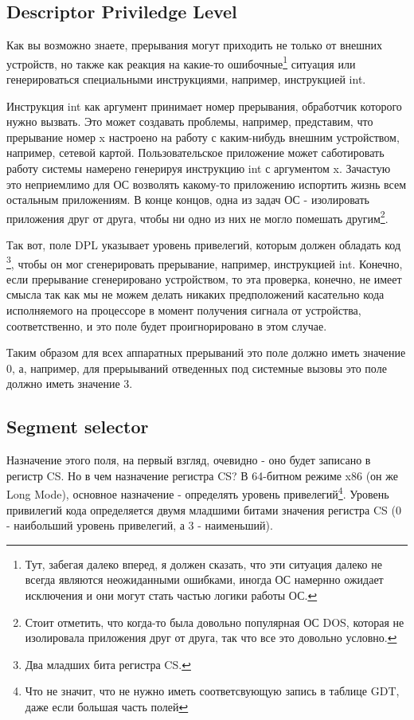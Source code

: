 \subsection{Descriptor Priviledge Level}

Как вы возможно знаете, прерывания могут приходить не только от внешних
устройств, но также как реакция на какие-то ошибочные\footnote{Тут, забегая
далеко вперед, я должен сказать, что эти ситуация далеко не всегда являются
неожиданными ошибками, иногда ОС намернно ожидает исключения и они могут стать
частью логики работы ОС.} ситуация или генерироваться специальными инструкциями,
например, инструкцией int.

Инструкция int как аргумент принимает номер прерывания, обработчик которого
нужно вызвать. Это может создавать проблемы, например, представим, что
прерывание номер x настроено на работу с каким-нибудь внешним устройством,
например, сетевой картой. Пользовательское приложение может саботировать работу
системы намерено генерируя инструкцию int с аргументом x. Зачастую это
неприемлимо для ОС возволять какому-то приложению испортить жизнь всем
остальным приложениям. В конце концов, одна из задач ОС - изолировать приложения
друг от друга, чтобы ни одно из них не могло помешать другим\footnote{Стоит
отметить, что когда-то была довольно популярная ОС DOS, которая не изолировала
приложения друг от друга, так что все это довольно условно.}.

Так вот, поле DPL указывает уровень привелегий, которым должен обладать код
\footnote{Два младших бита регистра CS.}, чтобы он мог сгенерировать прерывание,
например, инструкцией int. Конечно, если прерывание сгенерировано устройством,
то эта проверка, конечно, не имеет смысла так как мы не можем делать никаких
предположений касательно кода исполняемого на процессоре в момент получения
сигнала от устройства, соответственно, и это поле будет проигнорировано в этом
случае.

Таким образом для всех аппаратных прерываний это поле должно иметь значение 0,
а, например, для прерыываний отведенных под системные вызовы это поле должно
иметь значение 3.

\subsection{Segment selector}

Назначение этого поля, на первый взгляд, очевидно - оно будет записано в регистр
CS. Но в чем назначение регистра CS? В 64-битном режиме x86 (он же Long Mode),
основное назначение - определять уровень привелегий\footnote{Что не значит, что
не нужно иметь соответсвующую запись в таблице GDT, даже если большая часть
полей }. Уровень привилегий кода определяется двумя младшими битами значения
регистра CS (0 - наибольший уровень привелегий, а 3 - наименьший).

